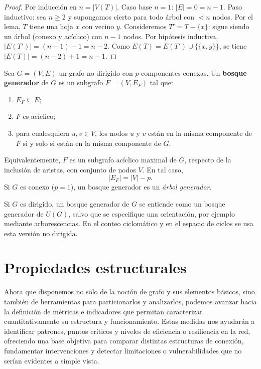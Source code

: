             \begin{proof}
                Por inducción en $n=|V(T)|$.
                Caso base $n=1$: $|E|=0=n-1$.
                Paso inductivo: sea $n\ge 2$ y supongamos cierto para todo árbol con $<n$ nodos. Por el lema, $T$ tiene una hoja $x$ con vecino $y$. Consideremos $T'=T-\{x\}$: sigue siendo un árbol (conexo y acíclico) con $n-1$ nodos. Por hipótesis inductiva, $|E(T')|=(n-1)-1=n-2$. Como $E(T)=E(T')\cup\{\{x,y\}\}$, se tiene $|E(T)|=(n-2)+1=n-1$.
            \end{proof}

            \begin{definicion}
                Sea $G=(V,E)$ un grafo no dirigido con $p$ componentes conexas. Un \textbf{bosque generador} de $G$ es un subgrafo $F=(V,E_F)$ tal que:
                \begin{enumerate}
                    \item $E_F\subseteq E$;
                    \item $F$ es acíclico;
                    \item para cualesquiera $u,v\in V$, los nodos $u$ y $v$ están en la misma componente de $F$ si y solo si están en la misma componente de $G$.
                \end{enumerate}
                Equivalentemente, $F$ es un subgrafo acíclico maximal de $G$, respecto de la inclusión de aristas, con conjunto de nodos $V$. En tal caso,
                \[
                    |E_F|=|V|-p.
                \]
                Si $G$ es conexo ($p=1$), un bosque generador es un \emph{árbol generador}.
            \end{definicion}

            \begin{observacion}
                Si $G$ es dirigido, un bosque generador de $G$ se entiende como un bosque generador de $U(G)$, salvo que se especifique una orientación, por ejemplo mediante arborescencias. En el conteo ciclomático y en el espacio de ciclos se usa esta versión no dirigida.
            \end{observacion}

        \section{Propiedades estructurales}

            Ahora que disponemos no solo de la noción de grafo y sus elementos básicos, sino también de herramientas para particionarlos y analizarlos, podemos avanzar hacia la definición de métricas e indicadores que permitan caracterizar cuantitativamente su estructura y funcionamiento. Estas medidas nos ayudarán a identificar patrones, puntos críticos y niveles de eficiencia o resiliencia en la red, ofreciendo una base objetiva para comparar distintas estructuras de conexión, fundamentar intervenciones y detectar limitaciones o vulnerabilidades que no serían evidentes a simple vista.

